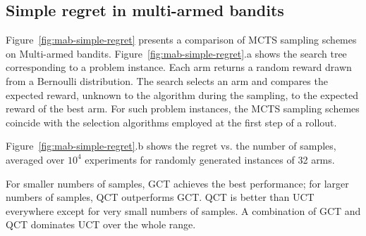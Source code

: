 \documentclass[letterpaper]{article}
\begin{document}
\subsection{Simple regret in multi-armed bandits}
\label{sec:emp-mab}

Figure~\ref{fig:mab-simple-regret} presents a comparison of MCTS sampling
schemes on Multi-armed bandits. Figure~\ref{fig:mab-simple-regret}.a shows the search tree
corresponding to a problem instance. Each arm returns a random reward
drawn from a Bernoulli distribution. The search selects an arm
and compares the expected reward, unknown to the algorithm during the
sampling, to the expected reward of the best arm. For such problem
instances, the MCTS sampling schemes coincide with the selection
algorithms employed at the first step of a rollout.

Figure~\ref{fig:mab-simple-regret}.b shows the regret
vs. the number of samples, averaged over $10^4$ experiments for
randomly generated instances of 32 arms. 

For smaller numbers of samples, GCT achieves the best
performance; for larger numbers of samples, QCT outperforms GCT. QCT is
better than UCT everywhere except for very small numbers of samples. A
combination of GCT and QCT dominates UCT over the whole range.
\end{document}
